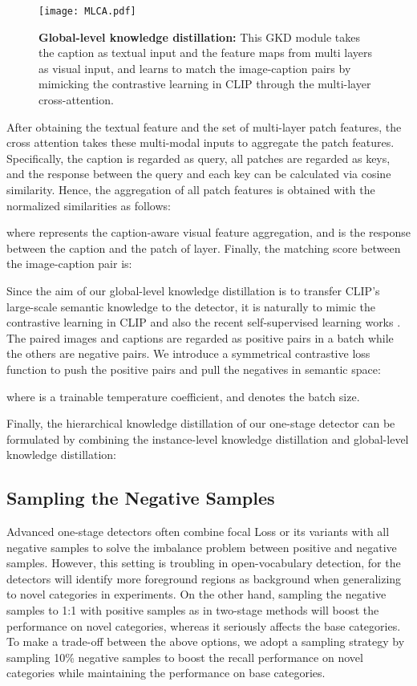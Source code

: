 \documentclass[10pt,twocolumn,letterpaper]{article}
\begin{document}
\begin{figure}[t]
\centering
\texttt{[image: MLCA.pdf]}
\caption{\textbf{Global-level knowledge distillation:} This GKD module takes the caption as textual input and the feature maps from multi layers as visual input, and learns to match the image-caption pairs by mimicking the contrastive learning in CLIP through the multi-layer cross-attention.}
\label{fig:global}
\vspace{-1.2em}
\end{figure}

After obtaining the textual feature and the set of multi-layer patch features, the cross attention takes these multi-modal inputs to aggregate the patch features. Specifically, the caption is regarded as query, all patches are regarded as keys, and the response between the query and each key can be calculated via cosine similarity. Hence, the aggregation of all patch features is obtained with the normalized similarities as follows:

where  represents the caption-aware visual feature aggregation, and  is the response between the caption and the  patch of  layer. Finally, the matching score  between the image-caption pair  is:



Since the aim of our global-level knowledge distillation is to transfer CLIP's large-scale semantic knowledge to the detector, it is naturally to mimic the contrastive learning in CLIP and also the recent self-supervised learning works \cite{he2020momentum, chen2020simple}. The paired images and captions are regarded as positive pairs in a batch while the others are negative pairs. We introduce a symmetrical contrastive loss function to push the positive pairs and pull the negatives in semantic space:

where  is a trainable temperature coefficient, and  denotes the batch size.

Finally, the hierarchical knowledge distillation of our one-stage detector can be formulated by combining the instance-level knowledge distillation and global-level knowledge distillation:


\subsection{Sampling the Negative Samples}
Advanced one-stage detectors often combine focal Loss \cite{Lin_2017_ICCV} or its variants \cite{li2020generalized, li2021generalized, Feng_2021_ICCV} with all negative samples to solve the imbalance problem between positive and negative samples. However, this setting is troubling in open-vocabulary detection, for the detectors will identify more foreground regions as background when generalizing to novel categories in experiments. On the other hand, sampling the negative samples to 1:1 with positive samples as in two-stage methods will boost the performance on novel categories, whereas it seriously affects the base categories. To make a trade-off between the above options, we adopt a sampling strategy by sampling 10\% negative samples to boost the recall performance on novel categories while maintaining the performance on base categories. 
\end{document}
